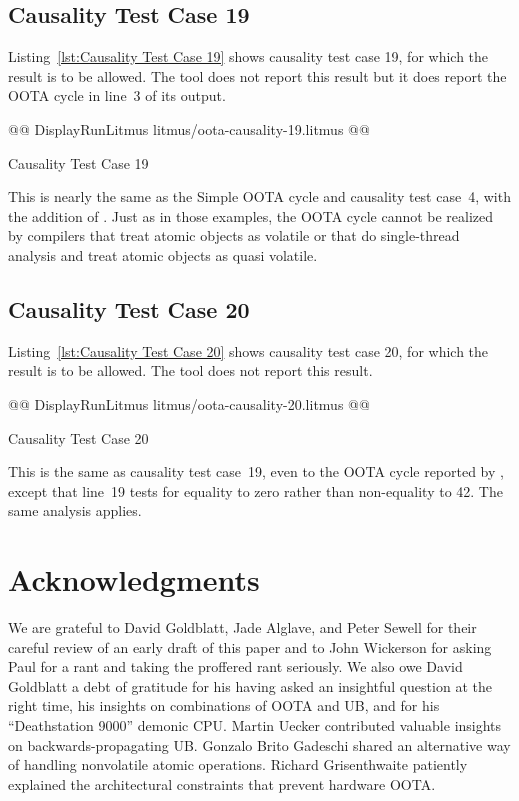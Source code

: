 \documentclass[10]{article}
\begin{document}
\subsection{Causality Test Case 19}
\label{app:Causality Test Case 19}

Listing~\ref{lst:Causality Test Case 19}
shows causality test case 19, for which the 
result is to be allowed.
The  tool does not report this result but it does report the
OOTA cycle in line~3 of its output.

\begin{listing}[tbp]
@@ DisplayRunLitmus litmus/oota-causality-19.litmus @@
\caption{Causality Test Case 19}
\label{lst:Causality Test Case 19}
\end{listing}

This is nearly the same as the Simple OOTA cycle and causality test
case~4, with the addition of .
Just as in those examples, the OOTA cycle cannot be realized by
compilers that treat atomic objects as volatile or that do
single-thread analysis and treat atomic objects as quasi volatile.

\subsection{Causality Test Case 20}
\label{app:Causality Test Case 20}

Listing~\ref{lst:Causality Test Case 20}
shows causality test case 20, for which the 
result is to be allowed.
The  tool does not report this result.

\begin{listing}[tbp]
@@ DisplayRunLitmus litmus/oota-causality-20.litmus @@
\caption{Causality Test Case 20}
\label{lst:Causality Test Case 20}
\end{listing}

This is the same as causality test case~19, even to the OOTA cycle
reported by , except that line~19 tests
 for equality to zero rather than non-equality to 42.
The same analysis applies.

\clearpage

\section{Acknowledgments}
\label{sec:Acknowledgments}

We are grateful to David Goldblatt, Jade Alglave, and Peter
Sewell for their careful review of an early draft of this paper and
to John Wickerson for asking Paul for a rant and taking the proffered
rant seriously.
We also owe David Goldblatt a debt of gratitude for his having asked an
insightful question at the right time, his insights on combinations of
OOTA and UB, and for his ``Deathstation 9000'' demonic CPU.
Martin Uecker contributed valuable insights on backwards-propagating UB.
Gonzalo Brito Gadeschi shared an alternative way of handling nonvolatile
atomic operations.
Richard Grisenthwaite patiently explained the architectural constraints
that prevent hardware OOTA.
\end{document}
